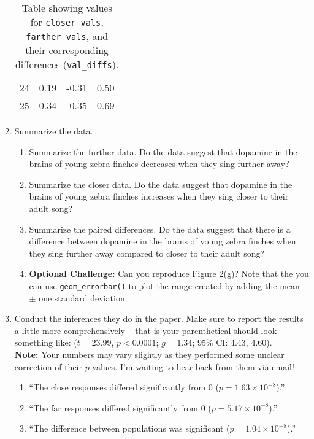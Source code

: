 \documentclass{article}\usepackage[]{graphicx}\usepackage[]{xcolor}
\begin{document}
\begin{enumerate}
\begin{table}[ht]
\begin{tabular}{rrrr}
  24 & 0.19 & -0.31 & 0.50 \\ 
  25 & 0.34 & -0.35 & 0.69 \\ 
   \hline
\end{tabular}
\caption{Table showing values for \texttt{closer\_vals}, \texttt{farther\_vals}, and their corresponding differences (\texttt{val\_diffs}).}
\label{table1}
\end{table}
\newpage
\item Summarize the data.
\begin{enumerate}
  \item Summarize the further data. Do the data suggest that
   dopamine in the brains of young zebra finches decreases when
   they sing further away?
   \item Summarize the closer data. Do the data suggest that
   dopamine in the brains of young zebra finches increases when
   they sing closer to their adult song?
  \item Summarize the paired differences. Do the data suggest
  that there is a difference between dopamine in the brains of
  young zebra finches when they sing further away compared to 
  closer to their adult song?
  \item \textbf{Optional Challenge:} Can you reproduce Figure 2(g)?
  Note that the you can use \texttt{geom\_errorbar()} to plot
  the range created by adding the mean $\pm$ one standard deviation.
\end{enumerate}
\item Conduct the inferences they do in the paper. Make sure to report the results
a little more comprehensively -- that is your parenthetical should look something
like: ($t=23.99$, $p<0.0001$; $g=1.34$; 95\% CI: 4.43, 4.60).\\
\textbf{Note:} Your numbers may vary slightly as they performed some unclear
correction of their $p$-values. I'm waiting to hear back from them via email!
\begin{enumerate}
  \item ``The close responses differed significantly from 0 ($p=1.63 \times 10^{-8}$).''
  \item ``The far responses differed significantly from 0 ($p=5.17 \times 10^{-8}$).''
  \item ``The difference between populations was significant ($p=1.04 \times10^{-8}$).''

\end{enumerate}
\end{enumerate}
\end{document}
